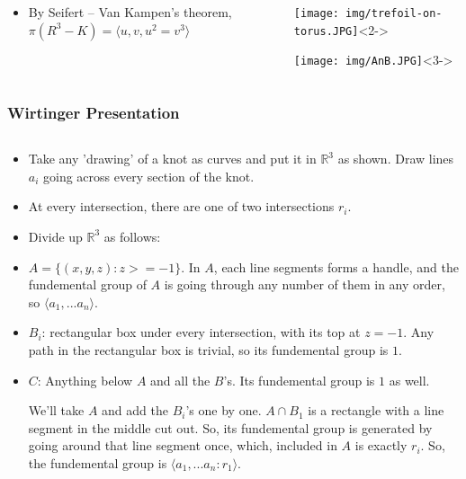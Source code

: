 \documentclass[8pt]{beamer}
\begin{document}
\begin{frame}
\begin{columns}
\begin{column}[T]{0.5\textwidth}
\begin{itemize}
          \item<8-> By Seifert -- Van Kampen's theorem, $\pi(R^3 - K) = \langle u,v,u^2 = v^3\rangle $
        \end{itemize}
      \end{column}
      \begin{column}[T]{0.5\textwidth}
        \begin{center}
        \texttt{[image: img/trefoil-on-torus.JPG]}<2->
        \end{center}
        \begin{center}
        \texttt{[image: img/AnB.JPG]}<3->
        \end{center}
      \end{column}
    \end{columns}
  \end{frame}
  \begin{frame}
    \frametitle{Wirtinger Presentation}
    \begin{columns}
      \begin{column}[T]{0.5\textwidth}
        \begin{itemize}
          \item<1-> Take any 'drawing' of a knot as curves and put it in
            $\mathbb{R}^3$ as shown. Draw lines $a_i$ going across every section
            of the knot.
          \item<2-> At every intersection, there are one of two intersections $r_i$.
          \item<3-> Divide up $\mathbb{R}^3$ as follows:
          \item<4-> $A = \{(x,y,z): z >= -1\}$. In $A$, each line segments forms a
            handle, and the fundemental group of $A$ is going through any number
            of them in any order, so $\langle a_1, ... a_n\rangle $.
          \item<5-> $B_i$: rectangular box under every intersection, with its top at
            $z = -1$. Any path in the rectangular box is trivial, so its fundemental group is $1$.
          \item<6-> $C$: Anything below $A$ and all the $B$'s. Its fundemental group is $1$ as well.

            We'll take $A$ and add the $B_i$'s one by one. $A \cap B_1$ is a
            rectangle with a line segment in the middle cut out. So, its
            fundemental group is generated by going around that line segment
            once, which, included in $A$ is exactly $r_i$. So, the fundemental
            group is $\langle a_1, ... a_n : r_1\rangle $.


\end{itemize}
\end{column}
\end{columns}
\end{frame}
\end{document}
